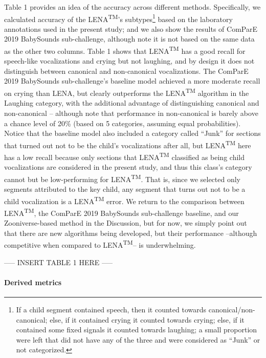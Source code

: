 \documentclass[english,,man]{apa6}
\begin{document}
Table 1 provides an idea of the accuracy across different methods. Specifically, we calculated accuracy of the LENA\textsuperscript{TM}'s subtypes\footnote{If a child segment contained speech, then it counted towards canonical/non-canonical; else, if it contained crying it counted towards crying; else, if it contained some fixed signals it counted towards laughing; a small proportion were left that did not have any of the three and were considered as \enquote{Junk} or not categorized.} based on the laboratory annotations used in the present study; and we also show the results of ComParE 2019 BabySounds sub-challenge, although note it is not based on the same data as the other two columns. Table 1 shows that LENA\textsuperscript{TM} has a good recall for speech-like vocalizations and crying but not laughing, and by design it does not distinguish between canonical and non-canonical vocalizations. The ComParE 2019 BabySounds sub-challenge's baseline model achieved a more moderate recall on crying than LENA, but clearly outperforms the LENA\textsuperscript{TM} algorithm in the Laughing category, with the additional advantage of distinguishing canonical and non-canonical -- although note that performance in non-canonical is barely above a chance level of 20\% (based on 5 categories, assuming equal probabilities). Notice that the baseline model also included a category called \enquote{Junk} for sections that turned out not to be the child's vocalizations after all, but LENA\textsuperscript{TM} here has a low recall because only sections that LENA\textsuperscript{TM} classified as being child vocalizations are considered in the present study, and thus this class's category cannot but be low-performing for LENA\textsuperscript{TM}. That is, since we selected only segments attributed to the key child, any segment that turns out not to be a child vocalization is a LENA\textsuperscript{TM} error. We return to the comparison between LENA\textsuperscript{TM}, the ComParE 2019 BabySounds sub-challenge baseline, and our Zooniverse-based method in the Discussion, but for now, we simply point out that there are new algorithms being developed, but their performance --although competitive when compared to LENA\textsuperscript{TM}-- is underwhelming.

----- INSERT TABLE 1 HERE -----

\hypertarget{derived-metrics}{%
\paragraph{Derived metrics}\label{derived-metrics}}
\end{document}
